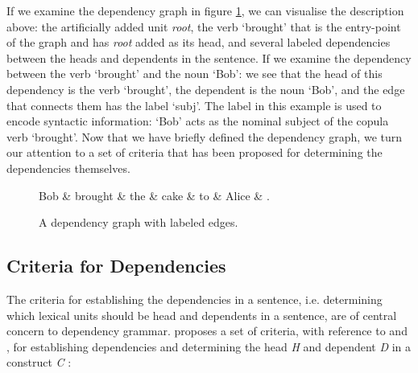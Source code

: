 If we examine the dependency graph in figure \ref{dep1}, we can visualise the description above: the artificially added unit \textit{root}, the verb `brought' that is the entry-point of the graph and has \textit{root} added as its head, and several labeled dependencies between the heads and dependents in the sentence. If we examine the dependency between the verb `brought' and the noun `Bob': we see that the head of this dependency is the verb `brought', the dependent is the noun `Bob', and the edge that connects them has the label `subj'. The label in this example is used to encode syntactic information: `Bob' acts as the nominal subject of the copula verb `brought'. Now that we have briefly defined the dependency graph, we turn our attention to a set of criteria that has been proposed for determining the dependencies themselves.

\begin{figure}
    \begin{dependency}[]
        \begin{deptext}[column sep=1em, row sep=.1ex]
            Bob \& brought \& the \& cake \& to \& Alice \& . \\
        \end{deptext}
    \end{dependency}
    \caption{A dependency graph with labeled edges.}
    \label{dep1}
\end{figure}

\subsection{Criteria for Dependencies}
\label{criteria}

The criteria for establishing the dependencies in a sentence, i.e. determining which lexical units should be head and dependents in a sentence, are of central concern to dependency grammar. \citeauthor{Niv:05} proposes a set of criteria, with reference to \citeauthor{Zwicky:85} and \citeauthor{Hudson:90}, for establishing dependencies and determining the head \textit{H} and dependent \textit{D} in a construct \textit{C} \cite{Zwicky:85, Hudson:90, Niv:05}:

